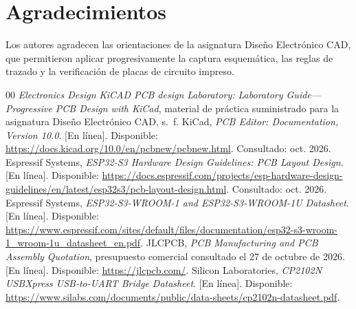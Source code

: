 \documentclass[journal,10pt]{IEEEtran}
\begin{document}
\section*{Agradecimientos}
Los autores agradecen las orientaciones de la asignatura Diseño Electrónico CAD, que permitieron aplicar progresivamente la captura esquemática, las reglas de trazado y la verificación de placas de circuito impreso.

\balance
\begin{thebibliography}{00}
 \emph{Electronics Design KiCAD PCB design Laboratory: Laboratory Guide---Progressive PCB Design with KiCad}, material de práctica suministrado para la asignatura Diseño Electrónico CAD, s.~f.
 KiCad, \emph{PCB Editor: Documentation, Version 10.0}. [En línea]. Disponible: \url{https://docs.kicad.org/10.0/en/pcbnew/pcbnew.html}. Consultado: oct. 2026.
 Espressif Systems, \emph{ESP32-S3 Hardware Design Guidelines: PCB Layout Design}. [En línea]. Disponible: \url{https://docs.espressif.com/projects/esp-hardware-design-guidelines/en/latest/esp32s3/pcb-layout-design.html}. Consultado: oct. 2026.
 Espressif Systems, \emph{ESP32-S3-WROOM-1 and ESP32-S3-WROOM-1U Datasheet}. [En línea]. Disponible: \url{https://www.espressif.com/sites/default/files/documentation/esp32-s3-wroom-1_wroom-1u_datasheet_en.pdf}.
 JLCPCB, \emph{PCB Manufacturing and PCB Assembly Quotation}, presupuesto comercial consultado el 27 de octubre de 2026. [En línea]. Disponible: \url{https://jlcpcb.com/}.
 Silicon Laboratories, \emph{CP2102N USBXpress USB-to-UART Bridge Datasheet}. [En línea]. Disponible: \url{https://www.silabs.com/documents/public/data-sheets/cp2102n-datasheet.pdf}.
\end{thebibliography}
\end{document}
